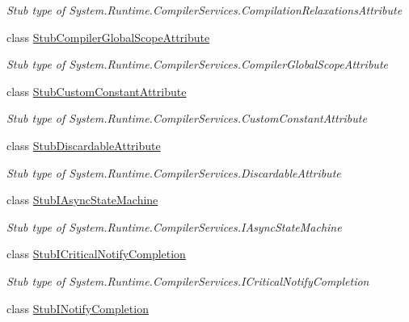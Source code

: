 \begin{DoxyCompactItemize}
\begin{DoxyCompactList}\small\item\em Stub type of System.\-Runtime.\-Compiler\-Services.\-Compilation\-Relaxations\-Attribute\end{DoxyCompactList}\item 
class \hyperlink{class_system_1_1_runtime_1_1_compiler_services_1_1_fakes_1_1_stub_compiler_global_scope_attribute}{Stub\-Compiler\-Global\-Scope\-Attribute}
\begin{DoxyCompactList}\small\item\em Stub type of System.\-Runtime.\-Compiler\-Services.\-Compiler\-Global\-Scope\-Attribute\end{DoxyCompactList}\item 
class \hyperlink{class_system_1_1_runtime_1_1_compiler_services_1_1_fakes_1_1_stub_custom_constant_attribute}{Stub\-Custom\-Constant\-Attribute}
\begin{DoxyCompactList}\small\item\em Stub type of System.\-Runtime.\-Compiler\-Services.\-Custom\-Constant\-Attribute\end{DoxyCompactList}\item 
class \hyperlink{class_system_1_1_runtime_1_1_compiler_services_1_1_fakes_1_1_stub_discardable_attribute}{Stub\-Discardable\-Attribute}
\begin{DoxyCompactList}\small\item\em Stub type of System.\-Runtime.\-Compiler\-Services.\-Discardable\-Attribute\end{DoxyCompactList}\item 
class \hyperlink{class_system_1_1_runtime_1_1_compiler_services_1_1_fakes_1_1_stub_i_async_state_machine}{Stub\-I\-Async\-State\-Machine}
\begin{DoxyCompactList}\small\item\em Stub type of System.\-Runtime.\-Compiler\-Services.\-I\-Async\-State\-Machine\end{DoxyCompactList}\item 
class \hyperlink{class_system_1_1_runtime_1_1_compiler_services_1_1_fakes_1_1_stub_i_critical_notify_completion}{Stub\-I\-Critical\-Notify\-Completion}
\begin{DoxyCompactList}\small\item\em Stub type of System.\-Runtime.\-Compiler\-Services.\-I\-Critical\-Notify\-Completion\end{DoxyCompactList}\item 
class \hyperlink{class_system_1_1_runtime_1_1_compiler_services_1_1_fakes_1_1_stub_i_notify_completion}{Stub\-I\-Notify\-Completion}

\end{DoxyCompactItemize}
